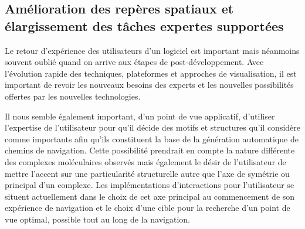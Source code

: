 

\subsection*{Amélioration des repères spatiaux et élargissement des tâches expertes supportées}

Le retour d'expérience des utilisateurs d'un logiciel est important mais néanmoins souvent oublié quand on arrive aux étapes de post-développement. Avec l'évolution rapide des techniques, plateformes et approches de visualisation, il est important de revoir les nouveaux besoins des experts et les nouvelles possibilités offertes par les nouvelles technologies. 

Il nous semble également important, d'un point de vue applicatif, d'utiliser l'expertise de l'utilisateur pour qu'il décide des motifs et structures qu'il considère comme importants afin qu'ils constituent la base de la génération automatique de chemins de navigation. Cette possibilité prendrait en compte la nature différente des complexes moléculaires observés mais également le désir de l'utilisateur de mettre l'accent sur une particularité structurelle autre que l'axe de symétrie ou principal d'un complexe.
Les implémentations d'interactions pour l'utilisateur se situent actuellement dans le choix de cet axe principal au commencement de son expérience de navigation et le choix d'une cible pour la recherche d'un point de vue optimal, possible tout au long de la navigation. 

